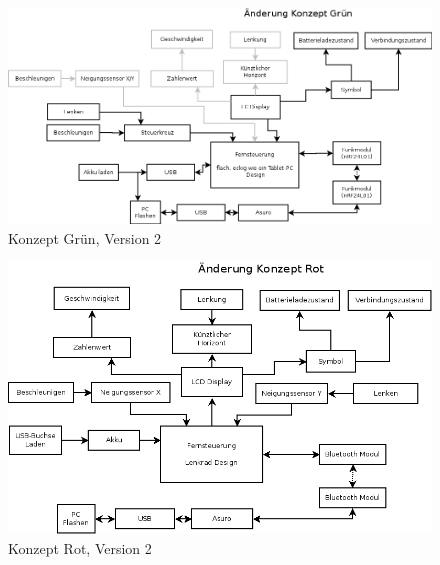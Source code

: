 \begin{figure}
	\centering
	\includegraphics[width=\textwidth]{konzepte_v2/Konzept_Gruen.png}
	\caption{Konzept Grün, Version 2}
	\label{fig:gruen_v2}
\end{figure}

\begin{figure}
	\centering
	\includegraphics[width=\textwidth]{konzepte_v2/Konzept_Rot.png}
	\caption{Konzept Rot, Version 2}
	\label{fig:rot_v2}
\end{figure}
